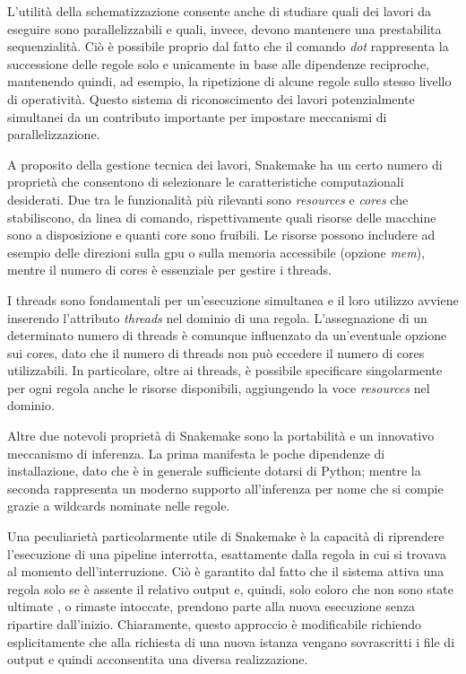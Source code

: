 L'utilità della schematizzazione consente anche di studiare quali dei lavori da eseguire sono parallelizzabili e quali, invece, devono mantenere una prestabilita sequenzialità. 
Ciò è possibile proprio dal fatto che il comando \textit{dot} rappresenta la successione delle regole solo e unicamente in base alle dipendenze reciproche, mantenendo quindi, ad esempio, la ripetizione di alcune regole sullo stesso livello di operatività.
Questo sistema di riconoscimento dei lavori potenzialmente simultanei da un contributo importante per impostare meccanismi di parallelizzazione. 

A proposito della gestione tecnica dei lavori, Snakemake ha un certo numero di proprietà che consentono di selezionare le caratteristiche computazionali desiderati. 
Due tra le funzionalità più rilevanti sono \textit{resources} e \textit{cores} che stabiliscono, da linea di comando, rispettivamente quali risorse delle macchine sono a disposizione e quanti core sono fruibili.
Le risorse possono includere ad esempio delle direzioni sulla gpu o sulla memoria accessibile (opzione \textit{mem}), mentre il numero di cores è essenziale per gestire i threads.

I threads sono fondamentali per un'esecuzione simultanea e il loro utilizzo avviene inserendo l'attributo \textit{threads} nel dominio di una regola.
L'assegnazione di un determinato numero di threads è comunque influenzato da un'eventuale opzione sui cores, dato che il numero di threads non può eccedere il numero di cores utilizzabili.
In particolare, oltre ai threads, è possibile specificare singolarmente per ogni regola anche le risorse disponibili, aggiungendo la voce \textit{resources} nel dominio. 

Altre due notevoli proprietà di Snakemake sono la portabilità e un innovativo meccanismo di inferenza.
La prima manifesta le poche dipendenze di installazione, dato che è in generale sufficiente dotarsi di Python; mentre la seconda rappresenta un moderno supporto all'inferenza per nome che si compie grazie a wildcards nominate nelle regole.

Una peculiarietà particolarmente utile di Snakemake è la capacità di riprendere l'esecuzione di una pipeline interrotta, esattamente dalla regola in cui si trovava al momento dell'interruzione.
Ciò è garantito dal fatto che il sistema attiva una regola solo se è assente il relativo output e, quindi, solo coloro che non sono state ultimate , o rimaste intoccate, prendono parte alla nuova esecuzione senza ripartire dall'inizio.
Chiaramente, questo approccio è modificabile richiendo esplicitamente che alla richiesta di una nuova istanza vengano sovrascritti i file di output e quindi acconsentita una diversa realizzazione.

